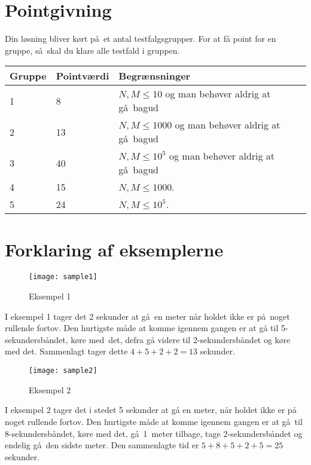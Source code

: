 \section*{Pointgivning}
Din løsning bliver kørt på et antal testfalgsgrupper.
For at få point for en gruppe, så skal du klare alle testfald i gruppen.

\noindent
\begin{tabular}{| l | l | l |}
\hline
Gruppe & Pointværdi & Begrænsninger \\ \hline
1     & 8          &  $N,M \le 10$ og man behøver aldrig at gå bagud\\ \hline
2     & 13         &  $N,M \le 1000$ og man behøver aldrig at gå bagud\\ \hline
3     & 40         &  $N,M \le 10^5$ og man behøver aldrig at gå bagud\\ \hline
4     & 15         &  $N,M \le 1000$. \\ \hline
5     & 24         &  $N,M \le 10^5$. \\ \hline
\end{tabular}

\section*{Forklaring af eksemplerne}

\begin{figure}[h]
	\centering
\texttt{[image: sample1]}
\caption{Eksempel 1}
\end{figure}
I eksempel 1 tager det 2 sekunder at gå en meter når holdet ikke er på noget rullende fortov.
Den hurtigste måde at komme igennem gangen er at gå til 5-sekundersbåndet, køre med det, defra gå videre til 2-sekundersbåndet og køre med det.
Sammenlagt tager dette $4+5+2+2=13$ sekunder.



\begin{figure}[h]
	\centering
\texttt{[image: sample2]}
\caption{Eksempel 2}
\end{figure}
I eksempel 2 tager det i stedet 5 sekunder at gå en meter, når holdet ikke er på noget rullende fortov.
Den hurtigste måde at komme igennem gangen er at gå til 8-sekundersbåndet, køre med det, gå 1~meter tilbage, tage 2-sekundersbåndet og endelig gå den sidste meter.
Den sammenlagte tid er $5+8+5+2+5=25$ sekunder.
